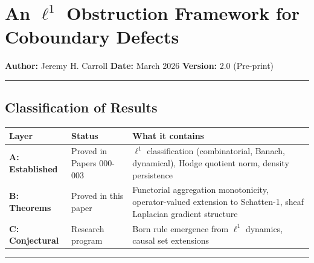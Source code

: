 \documentclass[
]{article}
\author{}
\date{}
\begin{document}
\section{\texorpdfstring{An \(\ell^1\) Obstruction Framework for
Coboundary
Defects}{An \textbackslash ell\^{}1 Obstruction Framework for Coboundary Defects}}\label{an-ell1-obstruction-framework-for-coboundary-defects}

\textbf{Author:} Jeremy H. Carroll \textbf{Date:} March 2026
\textbf{Version:} 2.0 (Pre-print)

\begin{center}\rule{0.5\linewidth}{0.5pt}\end{center}

\subsection{Classification of Results}\label{classification-of-results}

\begin{longtable}[]{@{}
  >{\raggedright\arraybackslash}p{}
  >{\raggedright\arraybackslash}p{}
  >{\raggedright\arraybackslash}p{}@{}}
\toprule\noalign{}
\begin{minipage}[b]{\linewidth}\raggedright
Layer
\end{minipage} & \begin{minipage}[b]{\linewidth}\raggedright
Status
\end{minipage} & \begin{minipage}[b]{\linewidth}\raggedright
What it contains
\end{minipage} \\
\midrule\noalign{}
\endhead
\bottomrule\noalign{}
\endlastfoot
\textbf{A: Established} & Proved in Papers 000-003 & \(\ell^1\)
classification (combinatorial, Banach, dynamical), Hodge quotient norm,
density persistence \\
\textbf{B: Theorems} & Proved in this paper & Functorial aggregation
monotonicity, operator-valued extension to Schatten-1, sheaf Laplacian
gradient structure \\
\textbf{C: Conjectural} & Research program & Born rule emergence from
\(\ell^1\) dynamics, causal set extensions \\
\end{longtable}

\begin{center}\rule{0.5\linewidth}{0.5pt}\end{center}
\end{document}
